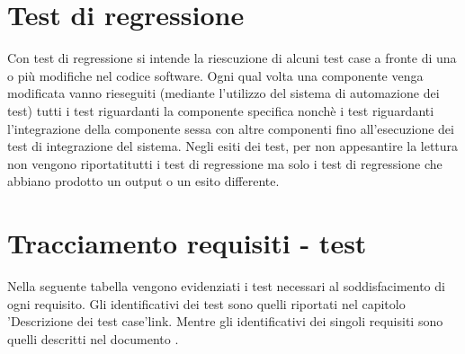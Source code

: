 \section{Test di regressione}
Con test di regressione si intende la riescuzione di alcuni test case a fronte di una o pi\`u modifiche nel codice software. Ogni qual volta una componente venga modificata vanno rieseguiti (mediante l'utilizzo del sistema di automazione dei test) tutti i test riguardanti la componente specifica nonch\`e i test riguardanti l'integrazione della componente sessa con altre componenti fino all'esecuzione dei test di integrazione del sistema.
Negli esiti dei test, per non appesantire la lettura non vengono riportatitutti i test di regressione ma solo i test di regressione che abbiano prodotto un output o un esito differente.

\section{Tracciamento requisiti - test}
Nella seguente tabella vengono evidenziati i test necessari al soddisfacimento di ogni requisito. Gli identificativi dei test sono quelli riportati nel capitolo 'Descrizione dei test case'{link}. Mentre gli identificativi dei singoli requisiti sono quelli descritti nel documento \AR .
